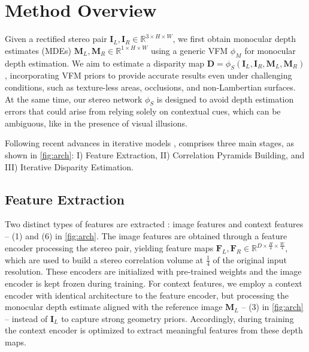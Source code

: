 

\section{Method Overview}
\label{sec:method}

Given a rectified stereo pair $\mathbf{I}_L, \mathbf{I}_R \in \mathbb{R}^{3 \times H \times W}$, we first obtain monocular depth estimates (MDEs) $\mathbf{M}_L, \mathbf{M}_R \in \mathbb{R}^{1 \times H \times W}$ using a generic VFM $\phi_M$ for monocular depth estimation. We aim to estimate a disparity map $\mathbf{D}=\phi_S(\mathbf{I}_L, \mathbf{I}_R, \mathbf{M}_L, \mathbf{M}_R)$, incorporating VFM priors to provide accurate results even under challenging conditions, such as texture-less areas, occlusions, and non-Lambertian surfaces. 
At the same time, our stereo network $\phi_S$ is designed to avoid depth estimation errors that could arise from relying solely on contextual cues, which can be ambiguous, like in the presence of visual illusions.

Following recent advances in iterative models \cite{lipson2021raft}, \method comprises three main stages, as shown in \cref{fig:arch}: I) Feature Extraction, II) Correlation Pyramids Building, and III) Iterative Disparity Estimation.

\subsection{Feature Extraction}

Two distinct types of features are extracted \cite{lipson2021raft}: image features and context features -- (1) and (6) in \cref{fig:arch}.
The image features are obtained through a feature encoder processing the stereo pair, yielding feature maps $\mathbf{F}_L, \mathbf{F}_R \in \mathbb{R}^{D \times \frac{H}{4} \times \frac{W}{4}}$, which are used to build a stereo correlation volume at $\frac{1}{4}$ of the original input resolution.
These encoders are initialized with pre-trained weights \cite{lipson2021raft} and the image encoder is kept frozen during training.
For context features, we employ a context encoder with identical architecture to the feature encoder, but processing the monocular depth estimate aligned with the reference image $\mathbf{M}_L$ -- (3) in \cref{fig:arch} -- instead of $\mathbf{I}_L$ to capture strong geometry priors. Accordingly, during training the context encoder is optimized to extract meaningful features from these depth maps.

